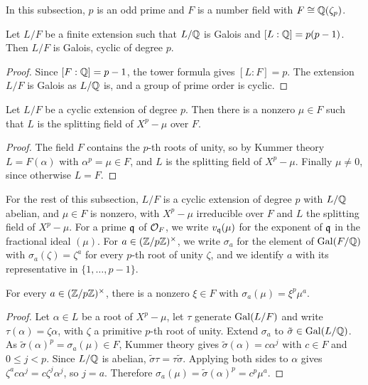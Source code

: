In this subsection, $p$ is an odd prime and $F$ is a number field with $F \cong \mathbb{Q}(\zeta_p)$.

\begin{lemma}
  \label{lem:kw_kummer_degree}
  \leanok
  Let $L/F$ be a finite extension such that $L/\mathbb{Q}$ is Galois and $[L:\mathbb{Q}] = p(p-1)$. Then $L/F$ is
  Galois, cyclic of degree $p$.
\end{lemma}

\begin{proof}
  \leanok
  Since $[F:\mathbb{Q}] = p - 1$, the tower formula gives $[L:F] = p$. The extension $L/F$ is Galois as
  $L/\mathbb{Q}$ is, and a group of prime order is cyclic.
\end{proof}

\begin{lemma}
  \label{lem:kw_kummer}
  \leanok
  Let $L/F$ be a cyclic extension of degree $p$. Then there is a nonzero $\mu \in F$ such that
  $L$ is the splitting field of $X^p - \mu$ over $F$.
\end{lemma}

\begin{proof}
  \leanok
  The field $F$ contains the $p$-th roots of unity, so by Kummer theory $L = F(\alpha)$ with
  $\alpha^p = \mu \in F$, and $L$ is the splitting field of $X^p - \mu$. Finally $\mu \neq 0$,
  since otherwise $L = F$.
\end{proof}

For the rest of this subsection, $L/F$ is a cyclic extension of degree $p$ with $L/\mathbb{Q}$ abelian,
and $\mu \in F$ is nonzero, with $X^p - \mu$ irreducible over $F$ and $L$ the splitting field of
$X^p - \mu$. For a prime $\mathfrak{q}$ of $\mathcal{O}_F$, we write $v_{\mathfrak{q}}(\mu)$ for the exponent of $\mathfrak{q}$ in
the fractional ideal $(\mu)$. For $a \in (\mathbb{Z}/p\mathbb{Z})^\times$, we write $\sigma_a$ for the element of
$\mathrm{Gal}(F/\mathbb{Q})$ with $\sigma_a(\zeta) = \zeta^a$ for every $p$-th root of unity $\zeta$, and we
identify $a$ with its representative in $\{1, \dots, p-1\}$.

\begin{lemma}
  \label{lem:kw_abelian_kummer}
  \leanok
  For every $a \in (\mathbb{Z}/p\mathbb{Z})^\times$, there is a nonzero $\xi \in F$ with $\sigma_a(\mu) = \xi^p
  \mu^a$.
\end{lemma}

\begin{proof}
  \leanok
  Let $\alpha \in L$ be a root of $X^p - \mu$, let $\tau$ generate $\mathrm{Gal}(L/F)$ and write
  $\tau(\alpha) = \zeta\alpha$, with $\zeta$ a primitive $p$-th root of unity. Extend $\sigma_a$ to
  $\tilde\sigma \in \mathrm{Gal}(L/\mathbb{Q})$. As $\tilde\sigma(\alpha)^p = \sigma_a(\mu) \in F$, Kummer theory
  gives $\tilde\sigma(\alpha) = c\alpha^j$ with $c \in F$ and $0 \leq j < p$. Since $L/\mathbb{Q}$ is
  abelian, $\tilde\sigma\tau = \tau\tilde\sigma$. Applying both sides to $\alpha$ gives $\zeta^a c
  \alpha^j = c\zeta^j\alpha^j$, so $j = a$. Therefore $\sigma_a(\mu) = \tilde\sigma(\alpha)^p =
  c^p\mu^a$.
\end{proof}

